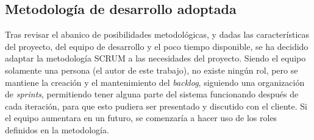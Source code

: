 \subsection{Metodología de desarrollo adoptada}

Tras revisar el abanico de posibilidades metodológicas, y dadas las características del proyecto, del equipo de desarrollo y el poco tiempo disponible, se ha decidido adaptar la metodología SCRUM a las necesidades del proyecto. Siendo el equipo solamente una persona (el autor de este trabajo), no existe ningún rol, pero se mantiene la creación y el mantenimiento del \textit{backlog}, siguiendo una organización de \textit{sprints}, permitiendo tener alguna parte del sistema funcionando después de cada iteración, para que esto pudiera ser presentado y discutido con el cliente. Si el equipo aumentara en un futuro, se comenzaría a hacer uso de los roles definidos en la metodología.





